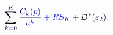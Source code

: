 \documentclass[12pt]{article}
\begin{document}
\makeatletter
\renewcommand*{\@textcolor}[3]{%
  \protect\leavevmode
  \begingroup
    \color#1{#2}#3%
  \endgroup
}
\makeatother
\begin{displaymath}
\mathcolor[RGB]{0,0,15}{\sum} _ { \mathcolor[RGB]{0,0,30}{k} \mathcolor[RGB]{0,0,45}{=} \mathcolor[RGB]{0,0,60}{0} } ^ { \mathcolor[RGB]{0,0,75}{K} } \mathcolor[RGB]{0,0,90}{\frac { \mathcolor[RGB]{0,0,105}{C} _ { \mathcolor[RGB]{0,0,120}{k} } \mathcolor[RGB]{0,0,135}{(} \mathcolor[RGB]{0,0,150}{p} \mathcolor[RGB]{0,0,165}{)} } { \mathcolor[RGB]{0,0,180}{a} ^ { \mathcolor[RGB]{0,0,195}{k} } } } \mathcolor[RGB]{0,0,210}{+} \mathcolor[RGB]{0,0,225}{R} \mathcolor[RGB]{0,0,240}{S} _ { \mathcolor[RGB]{0,0,255}{K} } \mathcolor[RGB]{0,15,0}{+} \mathfrak { \mathcolor[RGB]{0,15,15}{O} } ^ { \mathcolor[RGB]{0,15,30}{*} } \mathcolor[RGB]{0,15,45}{(} \mathcolor[RGB]{0,15,60}{\varepsilon} _ { \mathcolor[RGB]{0,15,75}{2} } \mathcolor[RGB]{0,15,90}{)} \mathcolor[RGB]{0,15,105}{.}
\end{displaymath}
\end{document}
